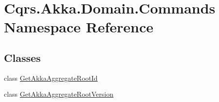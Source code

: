 \hypertarget{namespaceCqrs_1_1Akka_1_1Domain_1_1Commands}{}\section{Cqrs.\+Akka.\+Domain.\+Commands Namespace Reference}
\label{namespaceCqrs_1_1Akka_1_1Domain_1_1Commands}
\subsection*{Classes}
\begin{DoxyCompactItemize}
\item 
class \hyperlink{classCqrs_1_1Akka_1_1Domain_1_1Commands_1_1GetAkkaAggregateRootId}{Get\+Akka\+Aggregate\+Root\+Id}
\item 
class \hyperlink{classCqrs_1_1Akka_1_1Domain_1_1Commands_1_1GetAkkaAggregateRootVersion}{Get\+Akka\+Aggregate\+Root\+Version}
\end{DoxyCompactItemize}
